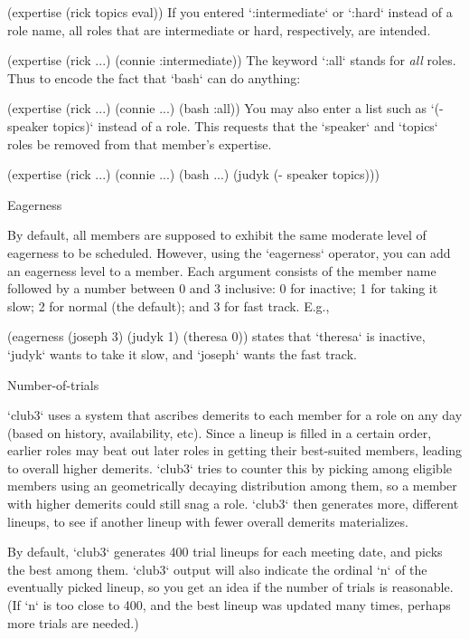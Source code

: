 \begintt
(expertise (rick topics eval))
\endtt
If you entered `:intermediate` or `:hard` instead of a role name, all roles
that are intermediate or hard, respectively, are intended.

\begintt
(expertise (rick ...)
           (connie :intermediate))
\endtt
The keyword `:all` stands for {\em all} roles.  Thus to encode the fact that
`bash` can do anything:

\begintt
(expertise (rick ...)
           (connie ...)
           (bash :all))
\endtt
You may also enter a list such as `(- speaker topics)` instead of a role.
This requests that the `speaker` and `topics` roles be removed from that
member’s expertise.

\begintt
(expertise (rick ...)
           (connie ...)
           (bash ...)
           (judyk (- speaker topics)))
\endtt

\beginsection Eagerness

By default, all members are supposed to exhibit the same moderate level
of eagerness to be scheduled.  However, using the `eagerness` operator,
you can add an eagerness level to a member.  Each argument consists of
the member name followed by a number between 0 and 3 inclusive: 0 for
inactive; 1 for taking it slow; 2 for normal (the default); and 3 for
fast track.  E.g.,

\begintt
(eagerness (joseph 3)
           (judyk 1)
           (theresa 0))
\endtt
states that `theresa` is inactive, `judyk` wants to take it slow, and `joseph`
wants the fast track.

\beginsection Number-of-trials

`club3` uses a system that ascribes demerits to each member for a role on
any day (based on history, availability, etc).  Since a lineup is filled
in a certain order, earlier roles may beat out later roles in getting
their best-suited members, leading to overall higher demerits.  `club3`
tries to counter this by picking among eligible members using an
geometrically decaying distribution among them, so a member with higher
demerits could still snag a role.  `club3` then generates more, different
lineups, to see if another lineup with fewer overall demerits
materializes.

By default, `club3` generates 400 trial lineups for each meeting date, and
picks the best among them.  `club3` output will also indicate the ordinal
`n` of the eventually picked lineup, so you get an idea if the number of
trials is reasonable.  (If `n` is too close to 400, and the best lineup
was updated many times, perhaps more trials are needed.)

